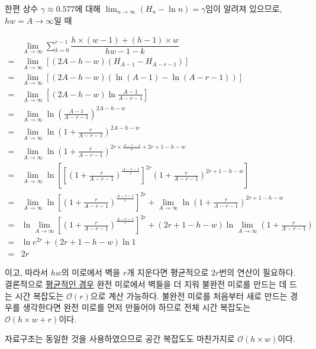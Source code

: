 한편 상수 $\gamma \approx 0.577$에 대해 $\displaystyle \lim_{n \rightarrow \infty} \left(H_n - \ln n\right) = \gamma$임이 알려져 있으므로,
$hw = A \rightarrow \infty$일 때

\begin{align*}
    & \lim_{A\rightarrow\infty} \sum_{k=0}^{r-1} \dfrac{h \times \left(w - 1\right) + \left(h - 1\right) \times w}{hw - 1 - k} \\
    =& \lim_{A\rightarrow\infty} \left[\left(2A - h - w\right) \left(H_{A - 1} - H_{A - r - 1}\right)\right] \\
    =& \lim_{A\rightarrow\infty} \left[\left(2A - h - w\right) \left(\ln \left(A - 1\right) - \ln \left(A - r - 1\right)\right)\right] \\
    =& \lim_{A\rightarrow\infty} \left[\left(2A - h - w\right) \ln \frac{A - 1}{A - r - 1}\right] \\
    =& \lim_{A\rightarrow\infty} \ln \left(\frac{A - 1}{A - r - 1}\right)^{2A - h - w} \\
    =& \lim_{A\rightarrow\infty} \ln \left(1 + \frac{r}{A - r - 1}\right)^{2A - h - w} \\
    =& \lim_{A\rightarrow\infty} \ln \left(1 + \frac{r}{A - r - 1}\right)^{2r \times \frac{A - r - 1}{r} + 2r + 1 - h - w} \\
    =& \lim_{A\rightarrow\infty} \ln \left[\left[\left(1 + \frac{r}{A - r - 1}\right)^{\frac{A - r - 1}{r}}\right]^{2r} \left(1 + \frac{r}{A - r - 1}\right)^{2r + 1 - h - w}\right] \\
    =& \lim_{A\rightarrow\infty} \ln \left[\left(1 + \frac{r}{A - r - 1}\right)^{\frac{A - r - 1}{r}}\right]^{2r} + \lim_{A\rightarrow\infty} \ln \left(1 + \frac{r}{A - r - 1}\right)^{2r + 1 - h - w} \\
    =& \ln \lim_{A\rightarrow\infty} \left[\left(1 + \frac{r}{A - r - 1}\right)^{\frac{A - r - 1}{r}}\right]^{2r} + \left(2r + 1 - h - w\right) \ln \lim_{A\rightarrow\infty} \left(1 + \frac{r}{A - r - 1}\right) \\
    =& \ln e^{2r} + \left(2r + 1 - h - w\right) \ln 1\\
    =& 2r
\end{align*}

이고, 따라서 $hw$의 미로에서 벽을 $r$개 지운다면
평균적으로 $2r$번의 연산이 필요하다. 결론적으로 \underline{평균적인 경우} 완전 미로에서 벽들을 더 지워 불완전 미로를 만드는 데 드는 시간 복잡도는
$\mathcal{O}\left(r\right)$으로 계산 가능하다. 불완전 미로를 처음부터 새로 만드는 경우를 생각한다면
완전 미로를 먼저 만들어야 하므로 전체 시간 복잡도는 $\mathcal{O}\left(h\times w + r\right)$이다.

자료구조는 동일한 것을 사용하였으므로 공간 복잡도도 마찬가지로 $\mathcal{O}\left(h\times w\right)$이다.


